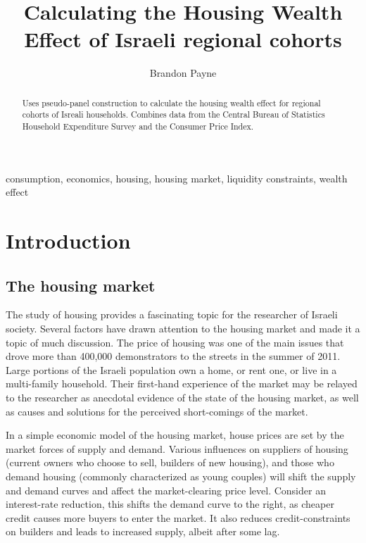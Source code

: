 \documentclass[12pt,a4paper,]{article}
\title{Calculating the Housing Wealth Effect of Israeli regional cohorts}
\author{Brandon Payne}
\date{}
\begin{document}
\maketitle

\begin{abstract}
Uses pseudo-panel construction to calculate the housing wealth effect for regional cohorts of Isreali households. Combines data from the Central Bureau of Statistics Household Expenditure Survey and the Consumer Price Index.
\end{abstract}

\begin{keywords}
 consumption, economics, housing, housing market, liquidity constraints, wealth effect 
\end{keywords}

\newpage

\section{Introduction}\label{introduction}

\subsection{The housing market}\label{the-housing-market}

The study of housing provides a fascinating topic for the researcher of
Israeli society. Several factors have drawn attention to the housing
market and made it a topic of much discussion. The price of housing was
one of the main issues that drove more than 400,000 demonstrators to the
streets in the summer of 2011. Large portions of the Israeli population
own a home, or rent one, or live in a multi-family household. Their
first-hand experience of the market may be relayed to the researcher as
anecdotal evidence of the state of the housing market, as well as causes
and solutions for the perceived short-comings of the market.

In a simple economic model of the housing market, house prices are set
by the market forces of supply and demand. Various influences on
suppliers of housing (current owners who choose to sell, builders of new
housing), and those who demand housing (commonly characterized as young
couples) will shift the supply and demand curves and affect the
market-clearing price level. Consider an interest-rate reduction, this
shifts the demand curve to the right, as cheaper credit causes more
buyers to enter the market. It also reduces credit-constraints on
builders and leads to increased supply, albeit after some lag.
\end{document}
